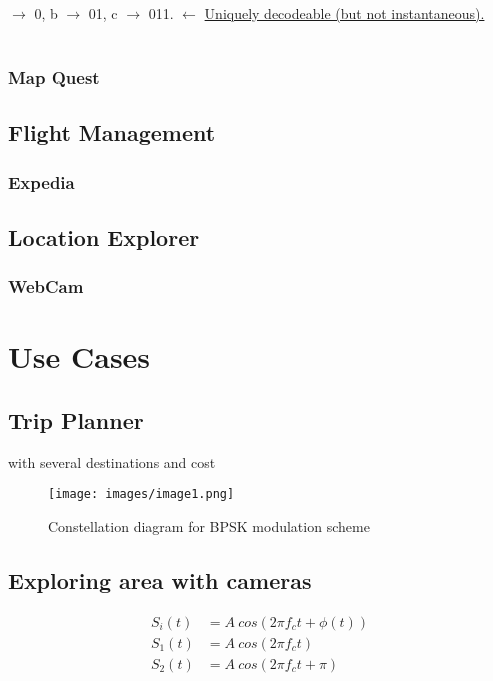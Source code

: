 \documentclass[12pt]{article}
\numberwithin{equation}{section} %
\numberwithin{figure}{section} %
\numberwithin{table}{section} %
\begin{document}
			$\rightarrow$ 0, b $\rightarrow$ 01, c $\rightarrow$ 011.\hspace{1cm} $\leftarrow$ \underline{Uniquely decodeable (but not instantaneous).} \\ \\
		\subsubsection{Map Quest}
	\subsection{Flight Management}
		\subsubsection{Expedia}
	\subsection{Location Explorer}
		\subsubsection{WebCam}
		
\newpage
\section{Use Cases}
	\subsection{Trip Planner}
	with several destinations and cost
	\begin{wrapfigure}[20]{r}{0.5\textwidth}
		\centering
		\texttt{[image: images/image1.png]}
		\caption{Constellation diagram for BPSK modulation scheme}
		\label{fig:BPSK_diagram}
	\end{wrapfigure}
	\subsection{Exploring area with cameras}
	\begin{align*}
		S_i(t) &= A \ cos(2\pi f_ct + \phi (t)) \\
		S_1(t) &= A \ cos(2\pi f_ct) \\ 
		S_2(t) &= A \ cos (2\pi f_ct+\pi)
	\end{align*}
\end{document}
